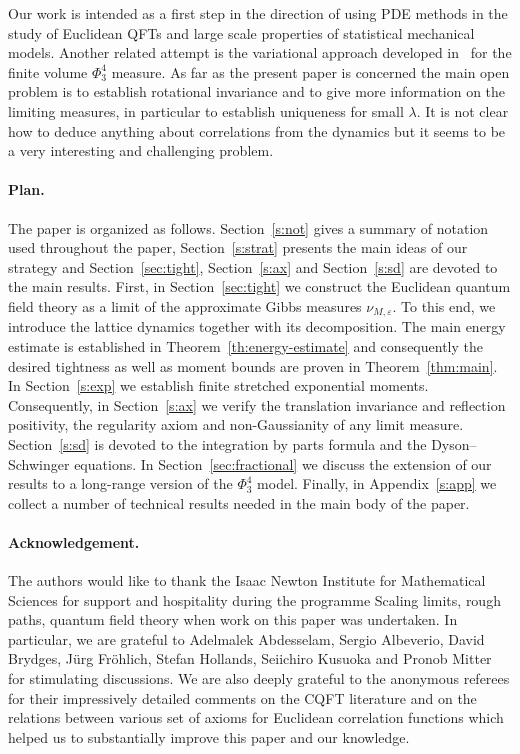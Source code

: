 \documentclass[a4paper,11pt]{article}
\numberwithin{equation}{section}
\begin{document}
\medskip
Our work is intended as a first step in the direction of using PDE methods in the study of
Euclidean QFTs and large scale properties of statistical mechanical models. Another related attempt is the variational approach developed in~\cite{barashkov_variational_2018} for the finite volume $\Phi^4_3$ measure.
As far as the present paper is concerned the main open problem is to establish rotational invariance and to give more information on the limiting measures, in particular to establish uniqueness for small $\lambda$. It is not clear how to deduce anything about correlations from the dynamics but it seems to be a very interesting and challenging problem. 



\paragraph{Plan.} The paper is organized as follows. Section~\ref{s:not} gives a summary of
notation used throughout the paper, Section~\ref{s:strat} presents the main ideas of our strategy and Section~\ref{sec:tight}, Section~\ref{s:ax} and
Section~\ref{s:sd} are devoted to the main results. First, in Section~\ref{sec:tight}
we construct the Euclidean quantum field theory as a limit of the approximate
Gibbs measures $\nu_{M, \varepsilon}$. To this end, we introduce the lattice
dynamics together with its decomposition. The main energy estimate is
established in Theorem~\ref{th:energy-estimate} and consequently the desired
tightness as well as moment bounds are proven in Theorem~\ref{thm:main}.  In
Section~\ref{s:exp} we establish finite stretched exponential moments. Consequently, in
Section~\ref{s:ax} we verify the translation invariance and reflection positivity, the regularity axiom
and non-Gaussianity of any limit measure. Section~\ref{s:sd} is devoted to the
integration by parts formula and the Dyson--Schwinger equations. In Section~\ref{sec:fractional} we discuss the extension of 
our results to a long-range version of the $\Phi^4_3$ model.
Finally, in Appendix~\ref{s:app} we collect a number of technical results
needed in the main body of the paper.

\paragraph{Acknowledgement.} The authors would like to thank the Isaac Newton
Institute for Mathematical Sciences for support and hospitality during the
programme Scaling limits, rough paths, quantum field theory when work on this
paper was undertaken. In particular, we are grateful to Adelmalek Abdesselam, Sergio Albeverio,
David Brydges, J{\"u}rg Fr{\"o}hlich, Stefan Hollands, Seiichiro Kusuoka and
Pronob Mitter for stimulating discussions. We are also deeply grateful to the anonymous referees for their impressively detailed comments on the CQFT literature and on the relations between various set of axioms for Euclidean correlation functions which helped us to  substantially improve this paper and our knowledge.
\end{document}
